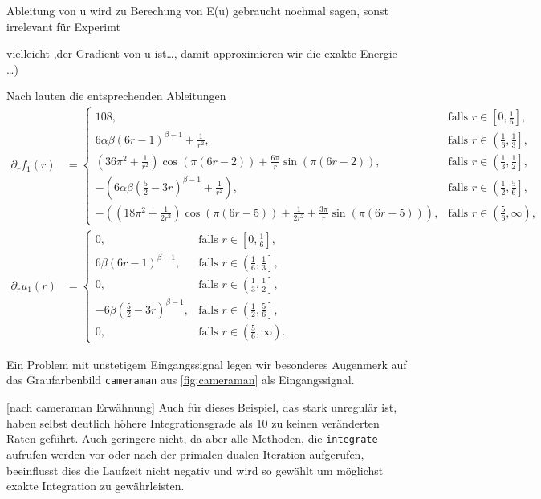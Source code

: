 Ableitung von u wird zu Berechung von E(u) gebraucht nochmal sagen, sonst 
irrelevant für Experimt

vielleicht ,der Gradient von u ist\ldots, damit approximieren wir die
exakte Energie \ldots)

Nach  lauten die entsprechenden Ableitungen
\begin{align*}
  \partial_r f_1(r)
  &=
  \begin{cases}
    108,
    & \text{falls } r\in\left[0,\frac{1}{6}\right],\\
    6\alpha\beta(6r-1)^{\beta-1} +\frac{1}{r^2}, 
    & \text{falls } r\in\left(\frac{1}{6},\frac{1}{3}\right],\\
    \left(36\pi^2+\frac{1}{r^2}\right)\cos(\pi(6r-2))
    + \frac{6\pi}{r}\sin(\pi(6r-2)), 
    & \text{falls } r\in\left(\frac{1}{3},\frac{1}{2}\right],\\
    -\left(6\alpha\beta\left( \frac{5}{2}-3r \right)^{\beta-1}+
    \frac{1}{r^2}\right),
    & \text{falls } r\in\left(\frac{1}{2},\frac{5}{6}\right],\\
    -\left( \left( 18\pi^2+\frac{1}{2r^2} \right)\cos(\pi(6r-5))
    +\frac{1}{2r^2} + \frac{3\pi}{r}\sin(\pi(6r-5))\right), 
    &\text{falls } r\in\left(\frac{5}{6},\infty\right),
  \end{cases}\\
  \partial_r u_1(r) 
  &= 
  \begin{cases}
    0,
    & \text{falls } r\in\left[0,\frac{1}{6}\right],\\
    6\beta(6r-1)^{\beta-1}, 
    & \text{falls } r\in\left(\frac{1}{6},\frac{1}{3}\right],\\
    0, 
    & \text{falls } r\in\left(\frac{1}{3},\frac{1}{2}\right],\\
    -6\beta\left( \frac{5}{2}-3r \right)^{\beta-1},
    & \text{falls } r\in\left(\frac{1}{2},\frac{5}{6}\right],\\
    0,
    &\text{falls } r\in\left(\frac{5}{6},\infty\right).
  \end{cases}
\end{align*}



Ein Problem mit unstetigem Eingangssignal legen wir besonderes
Augenmerk auf das Graufarbenbild \texttt{cameraman} aus \cref{fig:cameraman}
als Eingangssignal. 

[nach cameraman Erwähnung] Auch für dieses Beispiel, das stark unregulär ist,
haben selbst deutlich höhere Integrationsgrade als 10 zu keinen veränderten
Raten geführt. 
Auch geringere nicht, da aber alle Methoden, die \texttt{integrate} aufrufen
werden vor oder nach der primalen-dualen Iteration aufgerufen, 
beeinflusst dies die Laufzeit nicht negativ und wird so gewählt um möglichst
exakte Integration zu gewährleisten.

